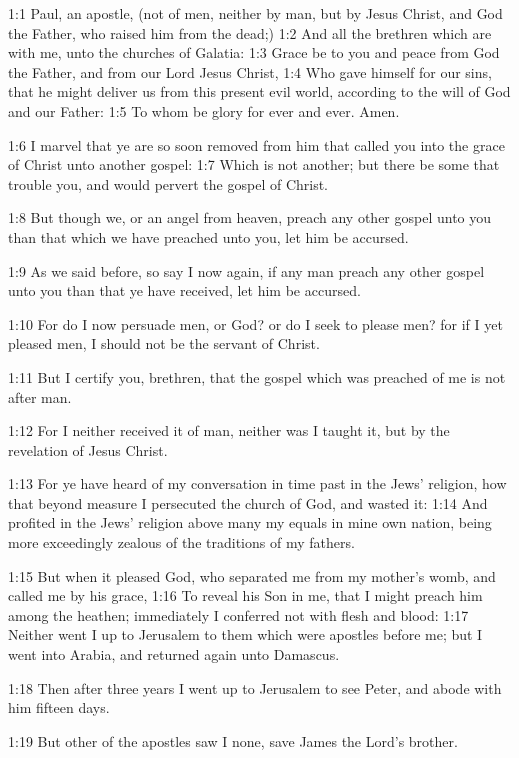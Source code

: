 

1:1 Paul, an apostle, (not of men, neither by man, but by Jesus Christ, and God the Father, who raised him from the dead;) 1:2 And all the brethren which are with me, unto the churches of Galatia: 1:3 Grace be to you and peace from God the Father, and from our Lord Jesus Christ, 1:4 Who gave himself for our sins, that he might deliver us from this present evil world, according to the will of God and our Father: 1:5 To whom be glory for ever and ever. Amen.

1:6 I marvel that ye are so soon removed from him that called you into the grace of Christ unto another gospel: 1:7 Which is not another; but there be some that trouble you, and would pervert the gospel of Christ.

1:8 But though we, or an angel from heaven, preach any other gospel unto you than that which we have preached unto you, let him be accursed.

1:9 As we said before, so say I now again, if any man preach any other gospel unto you than that ye have received, let him be accursed.

1:10 For do I now persuade men, or God? or do I seek to please men?  for if I yet pleased men, I should not be the servant of Christ.

1:11 But I certify you, brethren, that the gospel which was preached of me is not after man.

1:12 For I neither received it of man, neither was I taught it, but by the revelation of Jesus Christ.

1:13 For ye have heard of my conversation in time past in the Jews' religion, how that beyond measure I persecuted the church of God, and wasted it: 1:14 And profited in the Jews' religion above many my equals in mine own nation, being more exceedingly zealous of the traditions of my fathers.

1:15 But when it pleased God, who separated me from my mother's womb, and called me by his grace, 1:16 To reveal his Son in me, that I might preach him among the heathen; immediately I conferred not with flesh and blood: 1:17 Neither went I up to Jerusalem to them which were apostles before me; but I went into Arabia, and returned again unto Damascus.

1:18 Then after three years I went up to Jerusalem to see Peter, and abode with him fifteen days.

1:19 But other of the apostles saw I none, save James the Lord's brother.


